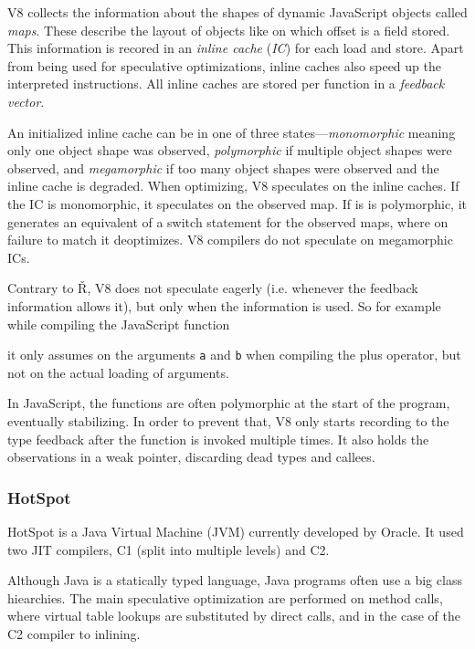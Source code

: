V8 collects the information about the shapes of dynamic JavaScript objects called \textit{maps}. These describe the layout of objects like on which offset is a field stored. This information is recored in an \textit{inline cache} (\textit{IC}) for each load and store. Apart from being used for speculative optimizations, inline caches also speed up the interpreted instructions. All inline caches are stored per function in a \textit{feedback vector}.

An initialized inline cache can be in one of three states---\textit{monomorphic} meaning only one object shape was observed, \textit{polymorphic} if multiple object shapes were observed, and \textit{megamorphic} if too many object shapes were observed and the inline cache is degraded. When optimizing, V8 speculates on the inline caches. If the IC is monomorphic, it speculates on the observed map. If is is polymorphic, it generates an equivalent of a switch statement for the observed maps, where on failure to match it deoptimizes. V8 compilers do not speculate on megamorphic ICs.\cite{v8stanton}

Contrary to Ř, V8 does not speculate eagerly (i.e. whenever the feedback information allows it), but only when the information is used. So for example while compiling the JavaScript function


\noindent it only assumes on the arguments \texttt{a} and \texttt{b} when compiling the plus operator, but not on the actual loading of arguments.

In JavaScript, the functions are often polymorphic at the start of the program, eventually stabilizing\cite{js-analysis}. In order to prevent that, V8 only starts recording to the type feedback after the function is invoked multiple times. It also holds the observations in a weak pointer, discarding dead types and callees.

\subsubsection*{HotSpot}

HotSpot\cite{hotspot} is a Java Virtual Machine (JVM) currently developed by Oracle. It used two JIT compilers, C1 (split into multiple levels) and C2.

Although Java is a statically typed language, Java programs often use a big class hiearchies. The main speculative optimization are performed on method calls, where virtual table lookups are substituted by direct calls, and in the case of the C2 compiler to inlining.

